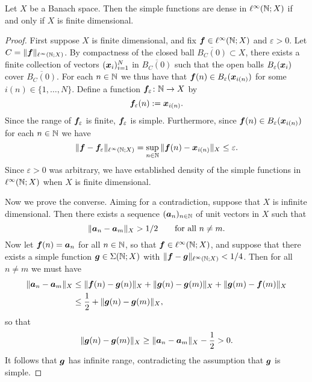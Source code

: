 \begin{prop}
  Let $X$ be a Banach space.
  Then the simple functions are dense in $\ell^\infty(\mathbb{N};X)$ if and only if $X$ is finite dimensional.
\end{prop}

\begin{proof}
  First suppose $X$ is finite dimensional, and fix $\bm{f} \in \ell^\infty(\mathbb{N};X)$ and $\varepsilon > 0$.
  Let $C = \|\bm{f}\|_{\ell^\infty(\mathbb{N};X)}$.
  By compactness of the closed ball $\overline{B_C(0)} \subset X$, there exists a finite collection of vectors $(\bm{x}_i)_{i=1}^N$ in $\overline{B_C(0)}$ such that the open balls $B_{\varepsilon}(\bm{x}_i)$ cover $\overline{B_C(0)}$.
  For each $n \in \mathbb{N}$ we thus have that $\bm{f}(n) \in B_{\varepsilon}(\bm{x}_{i(n)})$ for some $i(n) \in \{1,\ldots,N\}$.
  Define a function $\bm{f}_{\varepsilon} \colon \mathbb{N} \rightarrow X$ by
  \begin{equation*}
    \bm{f}_{\varepsilon}(n) := \bm{x}_{i(n)}.
  \end{equation*}
  Since the range of $\bm{f}_{\varepsilon}$ is finite, $\bm{f}_{\varepsilon}$ is simple.
  Furthermore, since $\bm{f}(n) \in B_{\varepsilon}(\bm{x}_{i(n)})$ for each $n \in \mathbb{N}$ we have
  \begin{equation*}
    \|\bm{f} - \bm{f}_{\varepsilon}\|_{\ell^\infty(\mathbb{N};X)} = \sup_{n \in \mathbb{N}} \|\bm{f}(n) - \bm{x}_{i(n)}\|_{X} \leq \varepsilon.
  \end{equation*}
  Since $\varepsilon > 0$ was arbitrary, we have established density of the simple functions in $\ell^\infty(\mathbb{N};X)$ when $X$ is finite dimensional.

  Now we prove the converse.
  Aiming for a contradiction, suppose that $X$ is infinite dimensional.
  Then there exists a sequence $(\bm{a}_n)_{n \in \mathbb{N}}$ of unit vectors in $X$ such that
  \begin{equation*}
    \|\bm{a}_n - \bm{a}_m\|_X > 1/2 \qquad \text{for all $n \neq m$.}
  \end{equation*}
  Now let $\bm{f}(n) = \bm{a}_n$ for all $n \in \mathbb{N}$, so that $\bm{f} \in \ell^\infty(\mathbb{N};X)$, and suppose that there exists a simple function $\bm{g} \in \Sigma(\mathbb{N};X)$ with $\|\bm{f} - \bm{g}\|_{\ell^\infty(\mathbb{N};X)} < 1/4$.
  Then for all $n \neq m$ we must have
  \begin{equation*}
    \begin{aligned}
      \|\bm{a}_n - \bm{a}_m\|_X &\leq \|\bm{f}(n) - \bm{g}(n)\|_X + \|\bm{g}(n) - \bm{g}(m)\|_X + \|\bm{g}(m) - \bm{f}(m)\|_X \\
      &\leq \frac{1}{2} + \|\bm{g}(n) - \bm{g}(m)\|_X,
    \end{aligned}
  \end{equation*}
  so that
  \begin{equation*}
    \|\bm{g}(n) - \bm{g}(m)\|_X \geq \|\bm{a}_n - \bm{a}_m\|_X - \frac{1}{2} > 0.
  \end{equation*}
  It follows that $\bm{g}$ has infinite range, contradicting the assumption that $\bm{g}$ is simple.
\end{proof}

